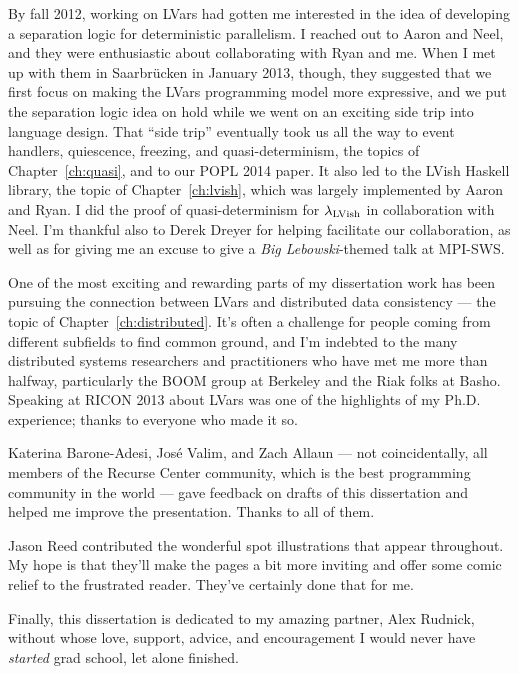 By fall 2012, working on LVars had gotten me interested in the idea of
developing a separation logic for deterministic parallelism.  I
reached out to Aaron and Neel, and they were enthusiastic about
collaborating with Ryan and me.  When I met up with them in
Saarbr{\"u}cken in January 2013, though, they suggested that we first
focus on making the LVars programming model more expressive, and we
put the separation logic idea on hold while we went on an exciting
side trip into language design.  That ``side trip'' eventually took us
all the way to event handlers, quiescence, freezing, and
quasi-determinism, the topics of Chapter~\ref{ch:quasi}, and to our
POPL 2014 paper.  It also led to the LVish Haskell library, the topic
of Chapter~\ref{ch:lvish}, which was largely implemented by Aaron and
Ryan.  I did the proof of quasi-determinism for $\lambda_{\textrm{LVish}}$ in
collaboration with Neel.  I'm thankful also to Derek Dreyer for
helping facilitate our collaboration, as well as for giving me an
excuse to give a \emph{Big Lebowski}-themed talk at MPI-SWS.

One of the most exciting and rewarding parts of my dissertation work
has been pursuing the connection between LVars and distributed data
consistency --- the topic of Chapter~\ref{ch:distributed}.  It's often
a challenge for people coming from different subfields to find common
ground, and I'm indebted to the many distributed systems researchers
and practitioners who have met me more than halfway, particularly the
BOOM group at Berkeley and the Riak folks at Basho.  Speaking at RICON
2013 about LVars was one of the highlights of my Ph.D. experience;
thanks to everyone who made it so.

Katerina Barone-Adesi, Jos\'{e} Valim, and Zach Allaun --- not
coincidentally, all members of the Recurse Center community, which is
the best programming community in the world --- gave feedback on
drafts of this dissertation and helped me improve the presentation.
Thanks to all of them.

Jason Reed contributed the wonderful spot illustrations that appear
throughout.  My hope is that they'll make the pages a bit more
inviting and offer some comic relief to the frustrated reader.
They've certainly done that for me.

Finally, this dissertation is dedicated to my amazing partner, Alex
Rudnick, without whose love, support, advice, and encouragement I
would never have \emph{started} grad school, let alone finished.
